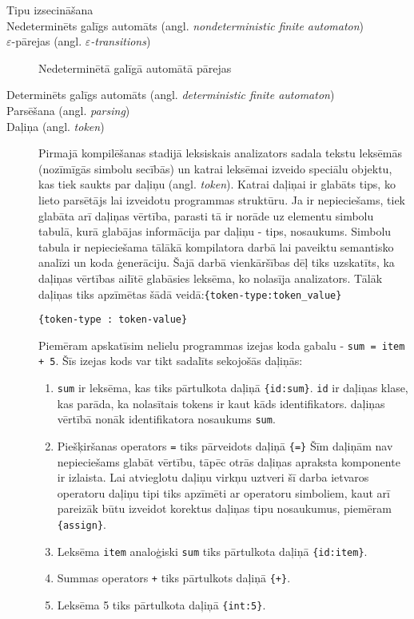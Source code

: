 \begin{description}
\item[Tipu izsecināšana]


\item[Nedeterminēts galīgs automāts (angl. \emph{nondeterministic finite automaton})]


\item[$\varepsilon$-pārejas (angl. \emph{$\varepsilon$-transitions})]
Nedeterminētā galīgā automātā pārejas


\item[Determinēts galīgs automāts (angl. \emph{deterministic finite automaton})]


\item[Parsēšana (angl. \emph{parsing})]


\item[Daļiņa (angl. \emph{token})]
Pirmajā kompilēšanas stadijā leksiskais analizators sadala tekstu leksēmās (nozīmīgās simbolu secībās) un katrai leksēmai izveido speciālu objektu, kas tiek saukts par daļiņu (angl. \emph{token}). Katrai daļiņai ir glabāts tips, ko lieto parsētājs lai izveidotu programmas struktūru. Ja ir nepieciešams, tiek glabāta arī daļiņas vērtība, parasti tā ir norāde uz elementu simbolu tabulā, kurā glabājas informācija par daļiņu - tips, nosaukums. Simbolu tabula ir nepieciešama tālākā kompilatora darbā lai paveiktu semantisko analīzi un koda ģenerāciju. Šajā darbā vienkāršības dēļ tiks uzskatīts, ka daļiņas vērtības ailītē glabāsies leksēma, ko nolasīja analizators. Tālāk daļiņas tiks apzīmētas šādā veidā:\verb|{token-type:token_value}|

\begin{verbatim}
{token-type : token-value}
\end{verbatim}

Piemēram apskatīsim nelielu programmas izejas koda gabalu - \verb|sum = item + 5|. Šīs izejas kods var tikt sadalīts sekojošās daļiņās:
\begin{enumerate}
\item \verb|sum| ir leksēma, kas tiks pārtulkota daļiņā \verb|{id:sum}|. \verb|id| ir daļiņas klase, kas parāda, ka nolasītais tokens ir kaut kāds identifikators. daļiņas vērtībā nonāk identifikatora nosaukums \verb|sum|.
\item Piešķiršanas operators \verb|=| tiks pārveidots daļiņā \verb|{=}| Šīm daļiņām nav nepieciešams glabāt vērtību, tāpēc otrās daļiņas apraksta komponente ir izlaista. Lai atvieglotu daļiņu virkņu uztveri šī darba ietvaros operatoru daļiņu tipi tiks apzīmēti ar operatoru simboliem, kaut arī pareizāk būtu izveidot korektus daļiņas tipu nosaukumus, piemēram \verb|{assign}|.
\item Leksēma \verb|item| analoģiski \verb|sum| tiks pārtulkota daļiņā \verb|{id:item}|.
\item Summas operators \verb|+| tiks pārtulkots daļiņā \verb|{+}|.
\item Leksēma 5 tiks pārtulkota daļiņā \verb|{int:5}|.
\end{enumerate}


\end{description}

